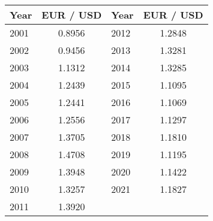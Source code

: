 \begin{tabular}{lc||lc}
\toprule
Year & EUR / USD & Year & EUR / USD \\
\midrule
2001 & 0.8956 & 2012 & 1.2848 \\
2002 & 0.9456 & 2013 & 1.3281 \\
2003 & 1.1312 & 2014 & 1.3285 \\
2004 & 1.2439 & 2015 & 1.1095 \\
2005 & 1.2441 & 2016 & 1.1069 \\
2006 & 1.2556 & 2017 & 1.1297 \\
2007 & 1.3705 & 2018 & 1.1810 \\
2008 & 1.4708 & 2019 & 1.1195 \\
2009 & 1.3948 & 2020 & 1.1422 \\
2010 & 1.3257 & 2021 & 1.1827 \\
2011 & 1.3920 & & \\
\bottomrule
\end{tabular}